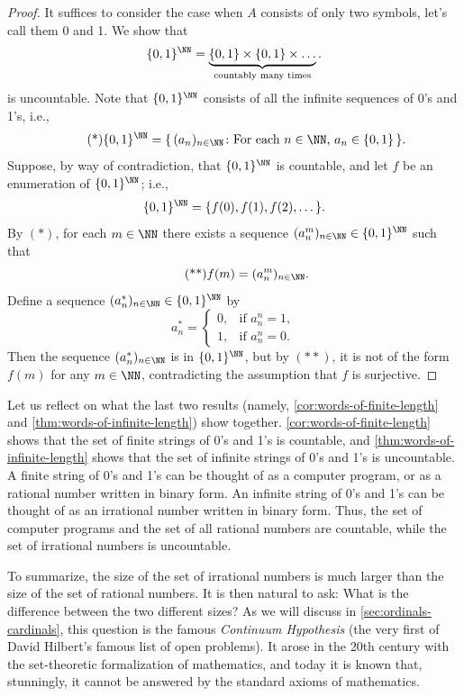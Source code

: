 \begin{proof}
  It suffices to consider the case when $A$ consists of only two symbols, let’s call them 0 and 1.  We show that
  \[
    \{0,1\}^{\NN} =\underbrace{\{0,1\}\times \{0,1\}\times\dots }_{\text{countably many times}}.
  \]
  is uncountable.
  Note that $\{0,1\}^{\NN}$ consists of all the infinite sequences of 0’s and 1’s, i.e.,
  \[
    \tag{*}
    \{0,1\}^{\NN} =\{\, (a_n)_{n\in\NN} \colon  \text{For each $n\in\NN$, $a_n\in\{0,1\}$} \, \}.
  \]
  Suppose, by way of contradiction, that $\{0,1\}^{\NN}$ is countable, and let $f$ be an enumeration of  $\{0,1\}^{\NN}$;
  i.e.,
  \[
    \{0,1\}^{\NN} =\{ f(0), f(1), f(2), \dots \}.
  \]
  By $(*)$, for each $m\in \NN$ there exists a sequence $(a_n^m)_{n\in\NN}\in \{0,1\}^{\NN}$ such that
  \[
    \tag{**}
    f(m) = (a_n^m)_{n\in\NN}.
  \]
  Define a sequence $(a_n^*)_{n\in\NN}\in \{0,1\}^{\NN}$ by
  \[
    a_n^*=
    \begin{cases}
    0, & \text{if $a_n^n=1$},  \\
    1, & \text{if  $a_n^n=0$}.
    \end{cases}
  \]
  Then the sequence $(a_n^*)_{n\in\NN}$ is in $\{0,1\}^{\NN}$, but by $(**)$, it is not of the form $f(m)$ for any $m\in\NN$, contradicting the assumption that $f$ is surjective.

\end{proof}

Let us reflect on what the last two results (namely, \cref{cor:words-of-finite-length} and \cref{thm:words-of-infinite-length}) show together.
\cref{cor:words-of-finite-length} shows that the set of finite strings of 0’s and 1’s  is countable, and \cref{thm:words-of-infinite-length} shows that the set of infinite strings of 0’s and 1’s is uncountable.
A finite string of 0’s and 1’s can be thought of as a computer program, or as a rational number written in binary form.
An infinite string of 0’s and 1’s can be thought of as  an irrational number written in binary form.
Thus, the set of computer programs and the set of all rational numbers are countable, while the set of irrational numbers is uncountable.

To summarize, the size of the set of irrational numbers is much larger than the size of the set of rational numbers.
It is then natural to ask:
What is the difference between the two different sizes?
As we will discuss  in \cref{sec:ordinals-cardinals}, this question is the famous \emph{Continuum Hypothesis} (the very first of David Hilbert’s famous list of open problems).
It arose in the 20th century with the set-theoretic formalization of mathematics, and today it is known that, stunningly, it cannot be answered by the standard axioms of mathematics.

